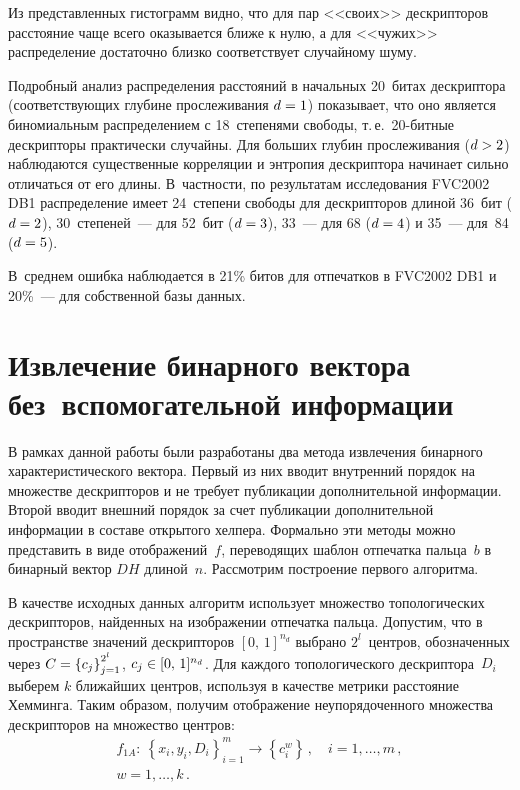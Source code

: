 \begin{multicols}{2}
      Из представленных гистограмм видно, что для пар <<своих>> дескрипторов 
расстояние чаще всего оказывается ближе к нулю, а для <<чужих>> распределение 
достаточно близко соответствует случайному шуму. 

Подробный анализ распределения 
расстояний в начальных 20~битах дескриптора (соответст\-ву\-ющих глубине прослеживания 
$d\hm = 1$) показывает, что оно является биномиальным распределением с 18~степенями 
свободы, т.\,е.\ 20-бит\-ные дескрипторы практически случайны. Для больших глубин 
прослеживания ($d \hm> 2$) наблюдаются существенные корреляции и энтропия 
дескриптора начинает сильно отличаться от его длины. В~част\-ности, по результатам 
исследования FVC2002 DB1 распределение имеет 24~степени свободы для дескрипторов 
длиной 36~бит ($d\hm = 2$), 30~степеней~--- для 52~бит ($d\hm = 3$), 33~--- для 68 ($d 
\hm= 4$) и 35~--- для~84 ($d \hm= 5$). 

В~среднем ошибка наблюдается в 21\% битов для 
отпечатков в FVC2002 DB1 и 20\%~--- для собственной базы данных.
      

\section{Извлечение бинарного вектора без~вспомогательной 
информации}

      В рамках данной работы были разработаны два метода извлечения бинарного 
характеристического вектора. Первый из них вводит внутренний порядок на множестве 
дескрипторов и не требует публикации дополнительной информации. Второй вводит 
внешний порядок за счет публикации дополнительной информации в составе открытого 
хелпера. Формально эти методы можно представить в виде отображений~$f$, 
переводящих шаблон отпечатка пальца~$b$ в бинарный вектор $DH$ длиной~$n$. 
Рассмотрим построение первого алгоритма.
      
      В качестве исходных данных алгоритм использует множество топологических 
дескрипторов, найден\-ных на изображении отпечатка пальца. До\-пус\-тим, что в 
пространстве значений дескрипторов $[0,\,1]^{n_d}$ выбрано $2^l$~центров, 
обозначенных через $C\hm=\left\{ c_j\right\}^{2^l}_{j=1}$, $c_j\hm\in[0,\,1]^{n_d}$. Для 
каждого топологического дескриптора~$D_i$ выберем $k$ ближайших центров, 
используя в качестве метрики расстояние Хемминга. Таким образом, получим 
отображение неупорядоченного множества дескрипторов на множество центров:
      \begin{multline*}
      f_{1A}:\ \left\{ x_i,y_i,D_i\right\}^m_{i=1}\rightarrow \left\{ c_i^w\right\}\,,\quad 
i=1, \ldots ,m\,,\\ 
w=1,\ldots , k\,.
      \end{multline*}
      

\end{multicols}
